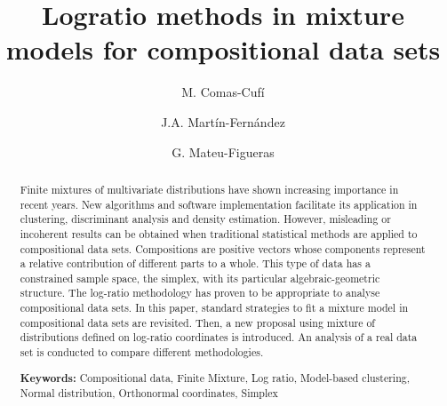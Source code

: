 \documentclass[10pt, a4paper]{article}
\title{Logratio methods in mixture models for compositional data sets}
\author{M. Comas-Cufí \and J.A. Martín-Fernández \and G. Mateu-Figueras}
\begin{document}
\maketitle




\begin{abstract}
Finite mixtures of multivariate distributions have shown increasing importance in recent years. New algorithms and software implementation facilitate its application in clustering, discriminant analysis and density estimation. 
However, misleading or incoherent results can be obtained when traditional statistical methods are applied to compositional data sets.
Compositions are positive vectors whose components represent a relative contribution of different parts to a whole.  This type of data has a constrained sample space, the simplex, with its particular algebraic-geometric structure. The log-ratio methodology has proven to be appropriate to analyse compositional data sets. In this paper, standard strategies to fit a mixture model in compositional data sets are revisited. Then, a new proposal using mixture of distributions defined on log-ratio coordinates is introduced. An analysis of a real data set is conducted to compare different methodologies.

{\bf Keywords:} Compositional data, Finite Mixture, Log ratio, Model-based clustering, Normal distribution, Orthonormal coordinates, Simplex
\end{abstract}



\end{document}
